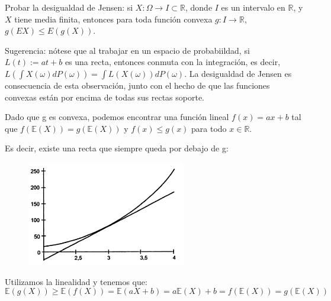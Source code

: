 \begin{problem}[7] Probar la desigualdad de Jensen: si $X:\Omega\to I\subset \mathbb{R}$, donde
$I$ es un intervalo en $\mathbb{R}$, y $X$ tiene media finita, entonces para toda funci\'on
convexa $g:I\to \mathbb{R}$, $g(EX) \le E(g(X))$. 

Sugerencia: n\'otese que al trabajar en un espacio de probabiildad, si $L(t) := a t + b$ es una recta, entonces conmuta con la integraci\'on,
es decir,
$L(\int X(\omega) dP (\omega)) = \int L (X(\omega)) dP (\omega)$. La desigualdad de Jensen
es consecuencia de esta observaci\'on, junto con el hecho de que las funciones convexas
est\'an por encima de todas sus rectas soporte.
\solution

\begin{expla}

\end{expla}
Dado que g es convexa, podemos encontrar una función lineal $f(x)=ax+b$ tal que $f(\mathbb{E}(X)) = g(\mathbb{E}(X))$ y $f(x)\leq g(x)$ para todo $x \in \mathbb{R}$.

Es decir, existe una recta que siempre queda por debajo de g:
\begin{figure}[h]
\centering
\includegraphics[page=1,scale=0.745]{img/jensen.png}
\end{figure} 

Utilizamos la linealidad y tenemos que:
\[
\mathbb{E}(g(X)) \geq \mathbb{E}(f(X)) = \mathbb{E}(aX+b)=a\mathbb{E}(X)+b=f(\mathbb{E}(X))=g(\mathbb{E}(X))
\]

\end{problem}


